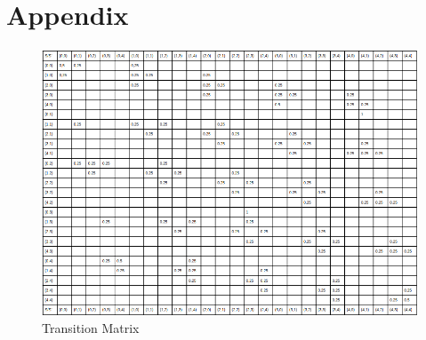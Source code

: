 \documentclass[11pt]{article}
\begin{document}
\newpage
\section{Appendix}

\begin{figure}[h]
\includegraphics[scale=0.5]{transition_matrix}
\centering
\caption{Transition Matrix}
\end{figure}
\end{document}
